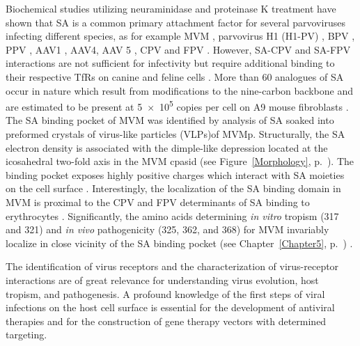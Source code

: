 Biochemical studies utilizing neuraminidase and proteinase K treatment have shown that SA is a common primary attachment factor for several parvoviruses infecting different species, as for example MVM \cite{pmid3296697, pmid16415031}, parvovirus H1 (H1-PV) \cite{pmid22258256}, BPV \cite{pmid15750863, pmid9747725, pmid15269359}, PPV \cite{pmid20484503}, AAV1 \cite{pmid16943302, pmid16940521}, AAV4, AAV 5 \cite{pmid15761263, pmid11435568, pmid11262413, pmid16409121}, CPV and FPV \cite{pmid1329321, pmid7975239}. However, SA-CPV and SA-FPV interactions are not sufficient for infectivity but require additional binding to their respective TfRs on canine and feline cells \cite{pmid1329321, pmid12525605, pmid11264378, pmid12885908}. More than 60 analogues of SA occur in nature which result from modifications to the nine-carbon backbone \cite{pmid17072005} and are estimated to be present at 5~$\times$~10\textsuperscript{5} copies per cell on A9 mouse fibroblasts \cite{pmid20517, pmid6602221}. The SA binding pocket of MVM was identified by analysis of SA soaked into preformed crystals of virus-like particles (VLPs)\footnotemark of MVMp. Structurally, the SA electron density is associated with the dimple-like depression located at the icosahedral two-fold axis in the MVM cpasid (see Figure~\ref{Morphology}, p.~\pageref{Morphology}). The binding pocket exposes highly positive charges which interact with SA moieties on the cell surface \cite{pmid16415031}. Interestingly, the localization of the SA binding domain in MVM is proximal to the CPV and FPV determinants of SA binding to erythrocytes \cite{pmid7645206, pmid8392729, pmid1329321, pmid10884355}. Significantly, the amino acids determining \textit{in vitro} tropism (317 and 321) and \textit{in vivo} pathogenicity (325, 362, and 368) for MVM invariably localize in close vicinity of the SA binding pocket (see Chapter~\ref{Chapter5}, p.~\pageref{Chapter5}) \cite{pmid16103145}.                  

The identification of virus receptors and the characterization of virus-receptor interactions are of great relevance for understanding virus evolution, host tropism, and pathogenesis. A profound knowledge of the first steps of viral infections on the host cell surface is essential for the development of antiviral therapies and for the construction of gene therapy vectors with determined targeting.    



